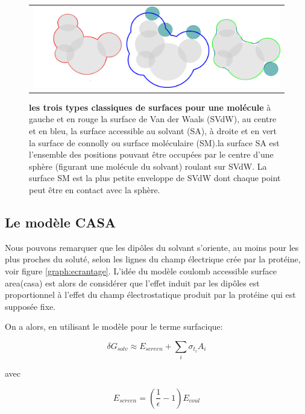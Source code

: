    \begin{figure}[!htbp]
     \centering
     \begin{tabular}{c}
       \includegraphics[width=12cm]{figure/surface.png} &
     \end{tabular}
     
     \caption{\textbf{les trois types classiques de surfaces pour une molécule} à gauche et en rouge la surface de Van der Waals (SVdW), au centre et en bleu, la surface accessible au solvant (SA), à droite et en vert  la surface de connolly ou surface moléculaire (SM).la surface SA est l'ensemble des positions pouvant être occupées par le centre d'une sphère (figurant une molécule du solvant) roulant sur SVdW. La surface SM est la plus petite enveloppe de SVdW dont chaque point peut être en contact avec la sphère. } 
\label{graph:surface}
   \end{figure}
   

\subsection{Le modèle CASA}

Nous pouvons remarquer que les dipôles du solvant s'oriente, au moins pour les plus proches du soluté, selon les lignes du champ électrique crée par la protéine, voir figure \ref{graph:ecrantage}. L'idée du modèle \og coulomb accessible surface area\fg (casa)  est alors de considérer que l'effet induit par les dipôles est proportionnel à l'effet du champ électrostatique produit par la protéine qui est supposée fixe. 

On a  alors, en utilisant le modèle  pour le terme surfacique:

\begin{equation}
\delta G_{solv} \approx E_{screen} + \sum_i \sigma_{t_i} A_i
\end{equation}

avec 

\begin{equation}
E_{screen} =  (\frac{1}{\epsilon} -1 )E_{coul}
\end{equation}

